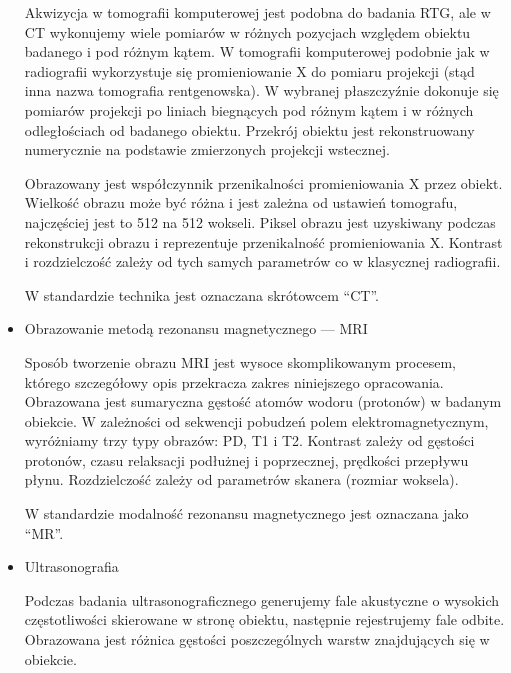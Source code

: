 \begin{itemize}
          Akwizycja w tomografii komputerowej jest podobna do badania RTG, ale w CT wykonujemy wiele pomiarów w różnych pozycjach względem obiektu badanego i pod różnym kątem.
          W tomografii komputerowej podobnie jak w radiografii wykorzystuje się promieniowanie X do pomiaru projekcji (stąd inna nazwa tomografia rentgenowska).
          W wybranej płaszczyźnie dokonuje się pomiarów projekcji po liniach biegnących pod różnym kątem i w różnych odległościach od badanego obiektu.
          Przekrój obiektu jest rekonstruowany numerycznie na podstawie zmierzonych projekcji wstecznej.

          Obrazowany jest współczynnik przenikalności promieniowania X przez obiekt.
          Wielkość obrazu może być różna i jest zależna od ustawień tomografu, najczęściej jest to 512 na 512 wokseli.
          Piksel obrazu jest uzyskiwany podczas rekonstrukcji obrazu i reprezentuje przenikalność promieniowania X.
          Kontrast i rozdzielczość zależy od tych samych parametrów co w klasycznej radiografii.

          W standardzie \DICOM technika jest oznaczana skrótowcem \enquote{CT}.

    \item Obrazowanie metodą rezonansu magnetycznego --- MRI

          Sposób tworzenie obrazu MRI jest wysoce skomplikowanym procesem, którego szczegółowy opis przekracza zakres niniejszego opracowania.
          Obrazowana jest sumaryczna gęstość atomów wodoru (protonów) w badanym obiekcie.
          W zależności od sekwencji pobudzeń polem elektromagnetycznym, wyróżniamy trzy typy obrazów: PD, T1 i T2.
          Kontrast zależy od gęstości protonów, czasu relaksacji podłużnej i poprzecznej, prędkości przepływu płynu.
          Rozdzielczość zależy od parametrów skanera (rozmiar woksela).

          W standardzie \DICOM modalność rezonansu magnetycznego jest oznaczana jako \enquote{MR}.

    \item Ultrasonografia

          Podczas badania ultrasonograficznego generujemy fale akustyczne o wysokich częstotliwości skierowane w stronę obiektu, następnie rejestrujemy fale odbite.
          Obrazowana jest różnica gęstości poszczególnych warstw znajdujących się w obiekcie.


\end{itemize}
